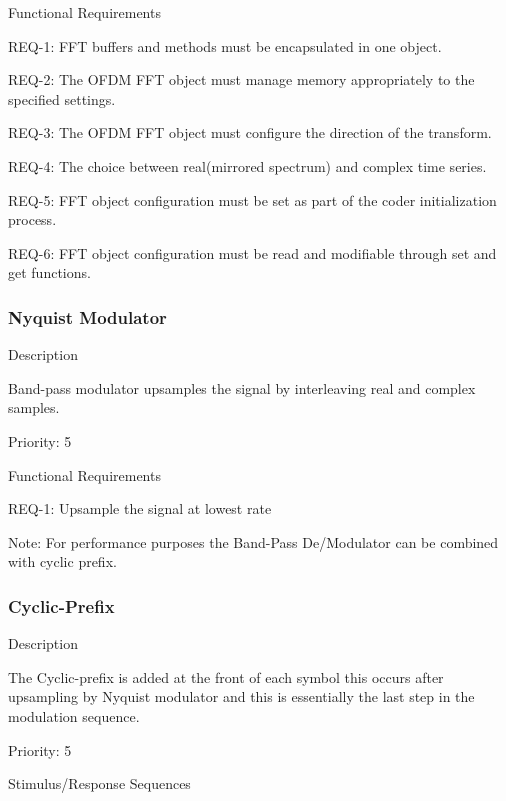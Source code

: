 \documentclass[]{report}
\begin{document}
Functional Requirements \par 

REQ-1: FFT buffers and methods must be encapsulated in one object.  \par
REQ-2: The OFDM FFT object must manage memory appropriately to the specified settings. \par
REQ-3: The OFDM FFT object must configure the direction of the transform.  \par
REQ-4: The choice between real(mirrored spectrum) and complex time series. \par
REQ-5: FFT object configuration must be set as part of the coder initialization process. \par
REQ-6: FFT object configuration must be read and modifiable through set and get functions. \par


\subsubsection{Nyquist Modulator}

Description \par
Band-pass modulator upsamples the signal by interleaving real and complex samples. \par

Priority: 5 \par

Functional Requirements \par
REQ-1: Upsample the signal at lowest rate \par

Note: For performance purposes the Band-Pass De/Modulator can be combined with cyclic prefix.\par


\subsubsection{Cyclic-Prefix}

Description\par
The Cyclic-prefix is added at the front of each symbol this occurs after upsampling by Nyquist modulator and this is essentially the last step in the modulation sequence. \par

Priority: 5  \par
 
Stimulus/Response Sequences \par
\end{document}
